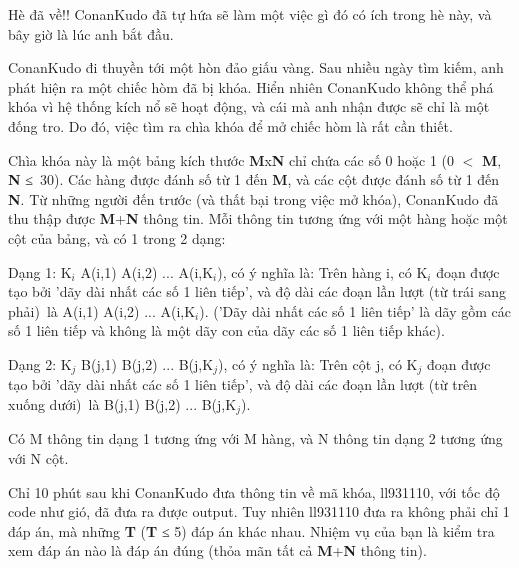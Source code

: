 Hè đã về!! ConanKudo đã tự hứa sẽ làm một việc gì đó có ích trong hè này, và bây giờ là lúc anh bắt đầu.

ConanKudo đi thuyền tới một hòn đảo giấu vàng. Sau nhiều ngày tìm kiếm, anh phát hiện ra một chiếc hòm đã bị khóa. Hiển nhiên ConanKudo không thể phá khóa vì hệ thống kích nổ sẽ hoạt động, và cái mà anh nhận được sẽ chỉ là một đống tro. Do đó, việc tìm ra chìa khóa để mở chiếc hòm là rất cần thiết.

Chìa khóa này là một bảng kích thước \textbf{M}x\textbf{N} chỉ chứa các số 0 hoặc 1 (0 $<$ \textbf{M}, \textbf{N} ≤ 30). Các hàng được đánh số từ 1 đến \textbf{M}, và các cột được đánh số từ 1 đến \textbf{N}. Từ những người đến trước (và thất bại trong việc mở khóa), ConanKudo đã thu thập được \textbf{M}+\textbf{N} thông tin. Mỗi thông tin tương ứng với một hàng hoặc một cột của bảng, và có 1 trong 2 dạng:

Dạng 1: K$_i$ A(i,1) A(i,2) ... A(i,K$_i$), có ý nghĩa là: Trên hàng i, có K$_i$ đoạn được tạo bởi 'dãy dài nhất các số 1 liên tiếp', và độ dài các đoạn lần lượt (từ trái sang phải) là A(i,1) A(i,2) ... A(i,K$_i$). ('Dãy dài nhất các số 1 liên tiếp' là dãy gồm các số 1 liên tiếp và không là một dãy con của dãy các số 1 liên tiếp khác).

Dạng 2: K$_j$ B(j,1) B(j,2) ... B(j,K$_j$), có ý nghĩa là: Trên cột j, có K$_j$ đoạn được tạo bởi 'dãy dài nhất các số 1 liên tiếp', và độ dài các đoạn lần lượt (từ trên xuống dưới) là B(j,1) B(j,2) ... B(j,K$_j$).

Có M thông tin dạng 1 tương ứng với M hàng, và N thông tin dạng 2 tương ứng với N cột.

Chỉ 10 phút sau khi ConanKudo đưa thông tin về mã khóa, ll931110, với tốc độ code như gió, đã đưa ra được output. Tuy nhiên ll931110 đưa ra không phải chỉ 1 đáp án, mà những \textbf{T} (\textbf{T} ≤ 5) đáp án khác nhau. Nhiệm vụ của bạn là kiểm tra xem đáp án nào là đáp án đúng (thỏa mãn tất cả \textbf{M}+\textbf{N} thông tin).